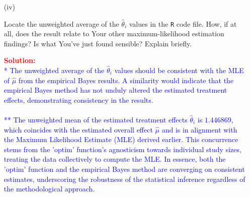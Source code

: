 \documentclass[12pt]{article}
\renewcommand{\t}[1]{\texttt{#1}}
\begin{document}
\begin{itemize}
\begin{itemize}
\item[(iv)]

Locate the unweighted average of the $\hat{ \theta }_i$ values in the \t{R} code file. How, if at all, does the result relate to Your other maximum-likelihood estimation findings? Is what You've just found sensible? Explain briefly. \textit{\fbox{\textbf{[10 points]}}}

\textcolor{red}{\textbf{Solution:}} \\
\textcolor{blue}{
* The unweighted average of the \( \hat{\theta}_i \) values should be consistent with the MLE of \( \hat{\mu} \) from the empirical Bayes results. A similarity would indicate that the empirical Bayes method has not unduly altered the estimated treatment effects, demonstrating consistency in the results. \\ \\ 
** The unweighted mean of the estimated treatment effects \( \hat{\theta}_i \) is \( 1.446869 \), which coincides with the estimated overall effect \( \hat{\mu} \) and is in alignment with the Maximum Likelihood Estimate (MLE) derived earlier. This concurrence stems from the 'optim' function's agnosticism towards individual study sizes, treating the data collectively to compute the MLE. In essence, both the 'optim' function and the empirical Bayes method are converging on consistent estimates, underscoring the robustness of the statistical inference regardless of the methodological approach.
}

\end{itemize}

\end{itemize}
\end{document}
